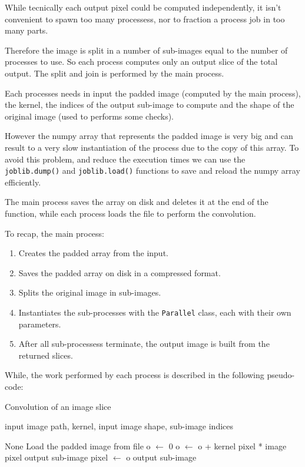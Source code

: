\documentclass[10pt,twocolumn,letterpaper]{article}
\begin{document}
While tecnically each output pixel could be computed independently, it isn't convenient to spawn too many processess, nor to fraction a process job in too many parts. 

Therefore the image is split in a number of sub-images equal to the number of processes to use. So each process computes only an output slice of the total output. The split and join is performed by the main process.

Each processes needs in input the padded image (computed by the main process), the kernel, the indices of the output sub-image to compute and the shape of the original image (used to performs some checks).

However the numpy array that represents the padded image is very big and can result to a very slow instantiation of the process due to the copy of this array. To avoid this problem, and reduce the execution times we can use the \verb"joblib.dump()" and \verb"joblib.load()" functions to save and reload the numpy array efficiently. 

The main process saves the array on disk and deletes it at the end of the function, while each process loads the file to perform the convolution.

To recap, the main process:

\begin{enumerate}
	\item Creates the padded array from the input.
	\item Saves the padded array on disk in a compressed format.
	\item Splits the original image in sub-images.
	\item Instantiates the sub-processes with the \verb"Parallel" class, each with their own parameters.
	\item After all sub-processess terminate, the output image is built from the returned slices.
\end{enumerate}

While, the work performed by each process is described in the following pseudo-code:

\begin{algorithm}[H]
	\label{alg:convolution_slice}
	\caption{Convolution of an image slice}
	\begin{algorithmic}
		\Require input image path, kernel, input image shape, sub-image indices
		\vspace{0.5cm}
		
		\State \Return None
		\Else
		\State Load the padded image from file
		\State o $\leftarrow$ 0
		\State o $\leftarrow$ o + kernel pixel * image pixel
		\EndFor
		\EndFor
		\State output sub-image pixel $\leftarrow$ o
		\EndFor
		\EndFor
		\EndFor
		\State \Return output sub-image
		\EndIf
		
	\end{algorithmic}
\end{algorithm}
\end{document}
